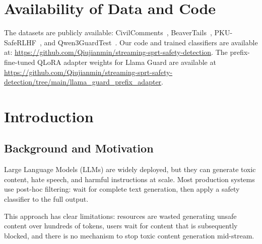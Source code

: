 \documentclass[acmtjournal, acmnowidth]{acmart}
\theoremstyle{definition}
\begin{document}


\maketitle

\section{Availability of Data and Code}

The datasets are publicly available: CivilComments~\cite{civilcomments}, BeaverTails~\cite{beavertails}, PKU-SafeRLHF~\cite{pku_saferlhf}, and Qwen3GuardTest~\cite{qwen3guard}.
Our code and trained classifiers are available at: \url{https://github.com/Qiujianmin/streaming-sprt-safety-detection}. The prefix-fine-tuned QLoRA adapter weights for Llama Guard are available at \url{https://github.com/Qiujianmin/streaming-sprt-safety-detection/tree/main/llama_guard_prefix_adapter}.

\section{Introduction}

\subsection{Background and Motivation}

Large Language Models (LLMs) are widely deployed, but they can generate toxic content, hate speech, and harmful instructions at scale. Most production systems use post-hoc filtering: wait for complete text generation, then apply a safety classifier to the full output.

This approach has clear limitations: resources are wasted generating unsafe content over hundreds of tokens, users wait for content that is subsequently blocked, and there is no mechanism to stop toxic content generation mid-stream.
\end{document}
